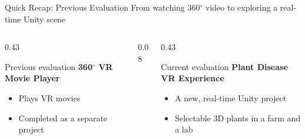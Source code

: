 \documentclass[aspectratio=169,11pt]{beamer}
\begin{document}
\begin{frame}{Quick Recap: Previous Evaluation}
  From watching 360$^\circ$ video to exploring a real-time Unity scene
  \vspace{1em}
  \begin{columns}[c]
    \begin{column}{0.43\textwidth}
      \begin{block}{Previous evaluation}
        \textbf{360$^\circ$ VR Movie Player}
        \begin{itemize}
          \item Plays VR movies
          \item Completed as a separate project
        \end{itemize}
      \end{block}
    \end{column}
    \begin{column}{0.08\textwidth}
      \centering{\Huge\textcolor{PlantGreen}{$\Rightarrow$}}
    \end{column}
    \begin{column}{0.43\textwidth}
      \begin{exampleblock}{Current evaluation}
        \textbf{Plant Disease VR Experience}
        \begin{itemize}
          \item A new, real-time Unity project
          \item Selectable 3D plants in a farm and a lab
        \end{itemize}
      \end{exampleblock}
    \end{column}
  \end{columns}
\end{frame}
\end{document}
